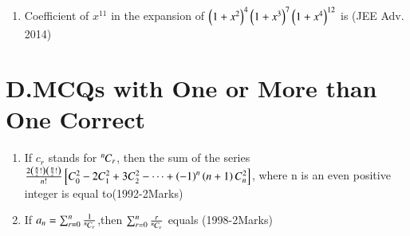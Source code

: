 \documentclass[journal]{IEEEtran}
\begin{document}
\begin{enumerate}
\item  Coefficient of $x^{11}$ in the expansion of $ \left(1+x^2\right)^4 \left(1+x^3\right)^7 \left(1+x^4\right)^{12}$ is \hfill(JEE Adv. 2014)

\begin{enumerate}
\end{enumerate}
\end{enumerate}
\section*{D.MCQs with One or More than One Correct}
\begin{enumerate}
	\item If $c_r$ stands for ${{}^{n}\mkern-1muC_{r}}$, then the sum of the series $\frac{2\left(\frac{n}{2}!\right)\left(\frac{n}{2}!\right)}{n!}{}\left[C_0^2-2C_1^2+3C_2^2-\dots+\left(-1\right)^n\left(n+1\right)C_n^2\right]$, where n is an even positive integer is equal to\hfill(1992-2Marks)
\begin{enumerate}
\end{enumerate}
\item If $a_n = \sum_{r=0}^{n}\frac{1}{{{}^{n}\mkern-1muC_{r}}}$,then $\sum_{r=0}^{n}\frac{r}{{{}^{n}\mkern-1muC_{r}}}$ equals \hfill(1998-2Marks)
\begin{enumerate}
\end{enumerate}
\end{enumerate}
\end{document}
